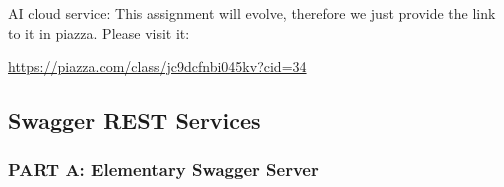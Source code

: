 \begin{exercise}

AI cloud service: This assignment will evolve, therefore we just
provide the link to it in piazza. Please visit it:

\url{https://piazza.com/class/jc9dcfnbi045kv?cid=34}
\end{exercise}

\subsection{Swagger REST Services}
\label{E:REST-swagger}
\subsubsection{PART A: Elementary Swagger Server}
 
